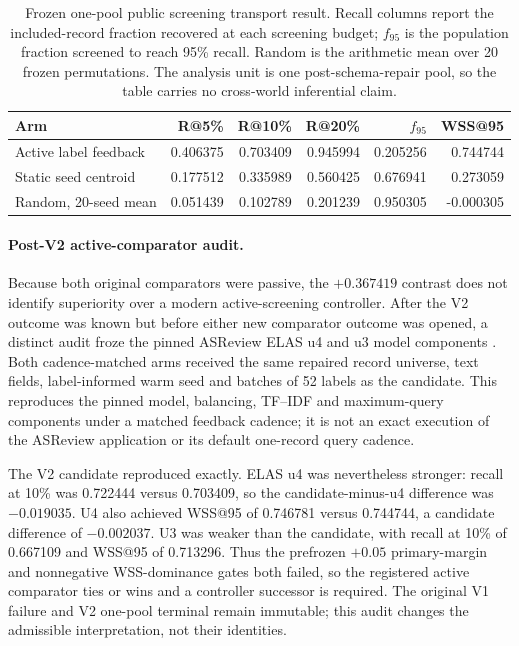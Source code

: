 \begin{table}[H]
\centering
\small
\begin{tabular}{lrrrrr}
\hline
Arm & R@5\% & R@10\% & R@20\% & $f_{95}$ & WSS@95 \\
\hline
Active label feedback & 0.406375 & 0.703409 & 0.945994 & 0.205256 & 0.744744 \\
Static seed centroid & 0.177512 & 0.335989 & 0.560425 & 0.676941 & 0.273059 \\
Random, 20-seed mean & 0.051439 & 0.102789 & 0.201239 & 0.950305 & -0.000305 \\
\hline
\end{tabular}
\caption{Frozen one-pool public screening transport result.  Recall columns
report the included-record fraction recovered at each screening budget;
$f_{95}$ is the population fraction screened to reach 95\% recall.  Random is
the arithmetic mean over 20 frozen permutations.  The analysis unit is one
post-schema-repair pool, so the table carries no cross-world inferential claim.}
\label{tab:p2-zenodo-transport}
\end{table}

\paragraph{Post-V2 active-comparator audit.}
Because both original comparators were passive, the $+0.367419$ contrast does
not identify superiority over a modern active-screening controller. After the
V2 outcome was known but before either new comparator outcome was opened, a
distinct audit froze the pinned ASReview ELAS u4 and u3 model components
\cite{vandeschoot2021asreview}. Both cadence-matched arms received the same
repaired record universe, text fields, label-informed warm seed and batches of
52 labels as the candidate. This reproduces the pinned model, balancing,
TF--IDF and maximum-query components under a matched feedback cadence; it is
not an exact execution of the ASReview application or its default one-record
query cadence.

The V2 candidate reproduced exactly. ELAS u4 was nevertheless stronger:
recall at 10\% was 0.722444 versus 0.703409, so the candidate-minus-u4
difference was $-0.019035$. U4 also achieved WSS@95 of 0.746781 versus
0.744744, a candidate difference of $-0.002037$. U3 was weaker than the
candidate, with recall at 10\% of 0.667109 and WSS@95 of 0.713296. Thus the
prefrozen $+0.05$ primary-margin and nonnegative WSS-dominance gates both
failed, so the registered active comparator ties or wins and a controller successor is required.
The original V1 failure and V2 one-pool terminal remain immutable; this audit
changes the admissible interpretation, not their identities.

